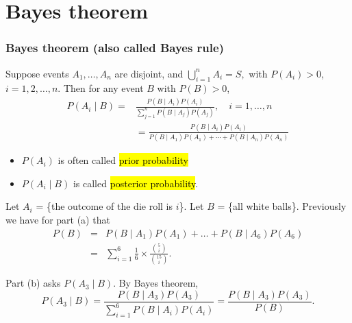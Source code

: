 \documentclass[slidestop,compress,mathserif]{beamer}
\begin{document}
\section{Bayes theorem}
\begin{frame}\frametitle{Bayes theorem (also called Bayes rule)}

Suppose events $A_1,\ldots,A_n$  are  disjoint, and
$\bigcup_{i=1}^n A_i = S,$
with $P(A_i) > 0$, $i = 1, 2, \ldots, n$.
Then for any event $B$ with $P(B) > 0$, \pause
\begin{align*}
P(A_i \mid B) = & \frac{P(B \mid A_i)P(A_i)}{\sum\limits_{j = 1}^n P(B \mid A_j)P(A_j)},
\quad i = 1, \ldots, n \\
& = \frac{P(B \mid A_i)P(A_i)}{P(B \mid A_1)P(A_1)+ \cdots + P(B \mid A_n)P(A_n)}
\end{align*}
\pause
\begin{itemize}
\item $P(A_i)$ is often called \hl{prior probability}
\item $P(A_i \mid B)$ is called \hl{posterior probability}.
\end{itemize}

\end{frame}





\begin{frame}

\pause

Let $A_i$ = \{the outcome of the die roll is $i$\}. Let $B$ = \{all white balls\}. Previously we have for part (a) that 
{\small{
\begin{eqnarray*}
P(B) &=& P(B \mid A_1)P(A_1)+\ldots+P(B \mid A_6)P(A_6) \\
        &=& \sum_{i=1}^{6} \frac{1}{6} \times \frac{{5 \choose i}}{{15 \choose i}}.
\end{eqnarray*}
}}

Part (b) asks $P(A_3 \mid B)$. By Bayes theorem,
\begin{equation*}
P(A_3 \mid B) = \frac{P(B \mid A_3) P(A_3)}{\sum_{i=1}^{6} P(B \mid A_i)P(A_i)} = \frac{P(B \mid A_3) P(A_3)}{P(B)}.
\end{equation*}

\end{frame}
\end{document}
